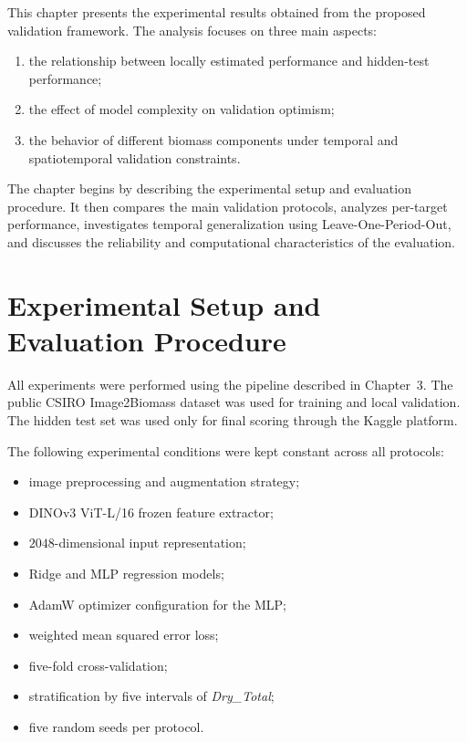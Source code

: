 

This chapter presents the experimental results obtained from the proposed validation framework. The analysis focuses on three main aspects:

\begin{enumerate}
    \item the relationship between locally estimated performance and hidden-test performance;
    \item the effect of model complexity on validation optimism;
    \item the behavior of different biomass components under temporal and spatiotemporal validation constraints.
\end{enumerate}

The chapter begins by describing the experimental setup and evaluation procedure. It then compares the main validation protocols, analyzes per-target performance, investigates temporal generalization using Leave-One-Period-Out, and discusses the reliability and computational characteristics of the evaluation.

\section{Experimental Setup and Evaluation Procedure}

All experiments were performed using the pipeline described in Chapter~3. The public CSIRO Image2Biomass dataset was used for training and local validation. The hidden test set was used only for final scoring through the Kaggle platform.

The following experimental conditions were kept constant across all protocols:

\begin{itemize}
    \item image preprocessing and augmentation strategy;
    \item DINOv3 ViT-L/16 frozen feature extractor;
    \item $2048$-dimensional input representation;
    \item Ridge and MLP regression models;
    \item AdamW optimizer configuration for the MLP;
    \item weighted mean squared error loss;
    \item five-fold cross-validation;
    \item stratification by five intervals of \textit{Dry\_Total};
    \item five random seeds per protocol.
\end{itemize}

